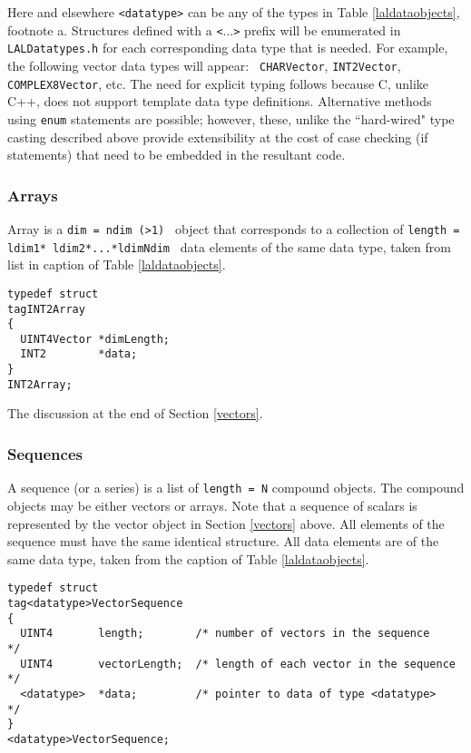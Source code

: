 \documentclass[]{ligodcc}
\begin{document}
Here and elsewhere  {\tt <datatype>} can be any of the types in
Table \ref{laldataobjects},
footnote a. Structures defined with a {\tt <}...{\tt >} prefix will be
enumerated in {\tt LALDatatypes.h}  for each corresponding data type that is
needed. For example, the following vector data types will appear: {\tt
CHARVector}, {\tt INT2Vector}, {\tt COMPLEX8Vector}, etc. The need for
explicit typing follows because C, unlike C++, does not support
template data type definitions. Alternative methods using {\tt enum}
statements are possible; however, these, unlike the ``hard-wired" type
casting described above provide extensibility at the cost of case
checking (if statements) that need to be embedded in the resultant
code.


\subsubsection{Arrays}
Array is a {\tt dim = ndim (>1) } object that corresponds to a
collection of {\tt length = ldim1* ldim2*...*ldimNdim } data elements of the
same data type, taken from list in caption of Table
\ref{laldataobjects}.


{\footnotesize
\begin{verbatim}
typedef struct
tagINT2Array
{
  UINT4Vector *dimLength;
  INT2        *data;
}
INT2Array;
\end{verbatim}}

\noindent
The discussion at the end of Section \ref{vectors}.


\subsubsection{Sequences}
\label{sequences}

A sequence (or a series) is a list of {\tt length = N} compound
objects. The compound objects may be either vectors or arrays. Note
that a sequence of scalars is represented by the vector object in
Section \ref{vectors} above.  All elements of the sequence must have the same
identical structure.  All data elements are of the same data type,
taken from the caption of Table \ref{laldataobjects}.

{\footnotesize
\begin{verbatim}
typedef struct
tag<datatype>VectorSequence
{
  UINT4       length;        /* number of vectors in the sequence     */
  UINT4       vectorLength;  /* length of each vector in the sequence */
  <datatype>  *data;         /* pointer to data of type <datatype>    */
}
<datatype>VectorSequence;
\end{verbatim}}
\end{document}
